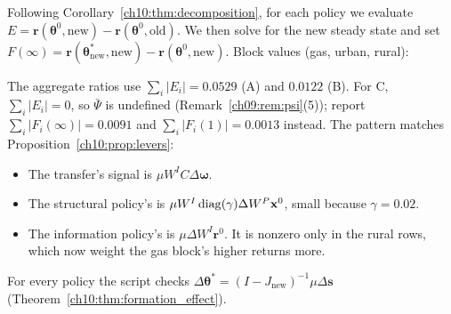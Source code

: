\documentclass[../solutions_manual.tex]{subfiles}
\begin{document}
 Following Corollary~\ref{ch10:thm:decomposition}, for each policy we evaluate $E = \mathbf{r}(\boldsymbol{\theta}^0, \text{new}) - \mathbf{r}(\boldsymbol{\theta}^0, \text{old})$. We then solve for the new steady state and set $F(\infty) = \mathbf{r}(\boldsymbol{\theta}^*_{\text{new}}, \text{new}) - \mathbf{r}(\boldsymbol{\theta}^0, \text{new})$. Block values (gas, urban, rural):
\begin{center}
\end{center}
The aggregate ratios use $\sum_i|E_i| = 0.0529$ (A) and $0.0122$ (B). For C, $\sum_i|E_i| = 0$, so $\bar\Psi$ is undefined (Remark~\ref{ch09:rem:psi}(5)); report $\sum_i|F_i(\infty)| = 0.0091$ and $\sum_i|F_i(1)| = 0.0013$ instead. The pattern matches Proposition~\ref{ch10:prop:levers}:
\begin{itemize}
\item The transfer's signal is $\mu W^IC\Delta\boldsymbol{\omega}$.
\item The structural policy's is $\mu W^I\operatorname{diag}(\gamma)\Delta W^P\mathbf{x}^0$, small because $\gamma = 0.02$.
\item The information policy's is $\mu\Delta W^I\mathbf{r}^0$. It is nonzero only in the rural rows, which now weight the gas block's higher returns more.
\end{itemize}
For every policy the script checks $\Delta\boldsymbol{\theta}^* = (I - J_{\text{new}})^{-1}\mu\Delta\mathbf{s}$ (Theorem~\ref{ch10:thm:formation_effect}).
\end{document}
